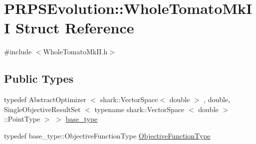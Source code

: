 \hypertarget{struct_p_r_p_s_evolution_1_1_whole_tomato_mk_i_i}{\section{\-P\-R\-P\-S\-Evolution\-:\-:\-Whole\-Tomato\-Mk\-I\-I \-Struct \-Reference}
\label{struct_p_r_p_s_evolution_1_1_whole_tomato_mk_i_i}
}


{\ttfamily \#include $<$\-Whole\-Tomato\-Mk\-I\-I.\-h$>$}

\subsection*{\-Public \-Types}
\begin{DoxyCompactItemize}
\item 
typedef \-Abstract\-Optimizer\*
$<$ shark\-::\-Vector\-Space$<$ double $>$\*
, double, \*
\-Single\-Objective\-Result\-Set\*
$<$ typename shark\-::\-Vector\-Space\*
$<$ double $>$\-::\-Point\-Type $>$ $>$ \hyperlink{struct_p_r_p_s_evolution_1_1_whole_tomato_mk_i_i_aa73bd76425f7fd7bf645f824163eaa88}{base\-\_\-type}
\item 
typedef \*
base\-\_\-type\-::\-Objective\-Function\-Type \hyperlink{struct_p_r_p_s_evolution_1_1_whole_tomato_mk_i_i_a55a538be606675a78b62960448ef4aef}{\-Objective\-Function\-Type}
\end{DoxyCompactItemize}
